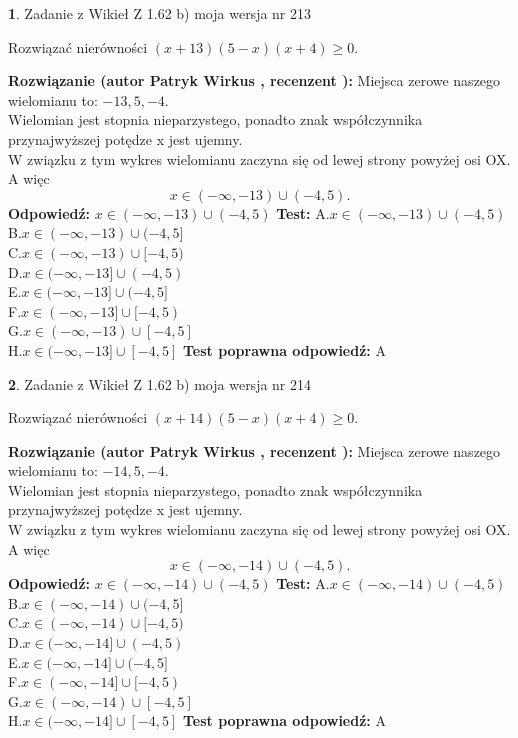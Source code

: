 \documentclass[12pt, a4paper]{article}
\theoremstyle{definition} %
\newtheorem{zad}{}
\newcommand{\zadStart}[1]{\begin{zad}#1\newline}
\newcommand{\zadStop}{\end{zad}}
\newcommand{\rozwStart}[2]{\noindent \textbf{Rozwiązanie (autor #1 , recenzent #2): }\newline}
\newcommand{\rozwStop}{\newline}
\newcommand{\odpStart}{\noindent \textbf{Odpowiedź:}\newline}
\newcommand{\odpStop}{\newline}
\newcommand{\testStart}{\noindent \textbf{Test:}\newline}
\newcommand{\testStop}{\newline}
\newcommand{\kluczStart}{\noindent \textbf{Test poprawna odpowiedź:}\newline}
\newcommand{\kluczStop}{\newline}
\begin{document}
\zadStart{Zadanie z Wikieł Z 1.62 b) moja wersja nr 213}

Rozwiązać nierówności $(x+13)(5-x)(x+4)\ge0$.
\zadStop
\rozwStart{Patryk Wirkus}{}
Miejsca zerowe naszego wielomianu to: $-13, 5, -4$.\\
Wielomian jest stopnia nieparzystego, ponadto znak współczynnika przy\linebreak najwyższej potędze x jest ujemny.\\ W związku z tym wykres wielomianu zaczyna się od lewej strony powyżej osi OX. A więc $$x \in (-\infty,-13) \cup (-4,5).$$
\rozwStop
\odpStart
$x \in (-\infty,-13) \cup (-4,5)$
\odpStop
\testStart
A.$x \in (-\infty,-13) \cup (-4,5)$\\
B.$x \in (-\infty,-13) \cup (-4,5]$\\
C.$x \in (-\infty,-13) \cup [-4,5)$\\
D.$x \in (-\infty,-13] \cup (-4,5)$\\
E.$x \in (-\infty,-13] \cup (-4,5]$\\
F.$x \in (-\infty,-13] \cup [-4,5)$\\
G.$x \in (-\infty,-13) \cup [-4,5]$\\
H.$x \in (-\infty,-13] \cup [-4,5]$
\testStop
\kluczStart
A
\kluczStop



\zadStart{Zadanie z Wikieł Z 1.62 b) moja wersja nr 214}

Rozwiązać nierówności $(x+14)(5-x)(x+4)\ge0$.
\zadStop
\rozwStart{Patryk Wirkus}{}
Miejsca zerowe naszego wielomianu to: $-14, 5, -4$.\\
Wielomian jest stopnia nieparzystego, ponadto znak współczynnika przy\linebreak najwyższej potędze x jest ujemny.\\ W związku z tym wykres wielomianu zaczyna się od lewej strony powyżej osi OX. A więc $$x \in (-\infty,-14) \cup (-4,5).$$
\rozwStop
\odpStart
$x \in (-\infty,-14) \cup (-4,5)$
\odpStop
\testStart
A.$x \in (-\infty,-14) \cup (-4,5)$\\
B.$x \in (-\infty,-14) \cup (-4,5]$\\
C.$x \in (-\infty,-14) \cup [-4,5)$\\
D.$x \in (-\infty,-14] \cup (-4,5)$\\
E.$x \in (-\infty,-14] \cup (-4,5]$\\
F.$x \in (-\infty,-14] \cup [-4,5)$\\
G.$x \in (-\infty,-14) \cup [-4,5]$\\
H.$x \in (-\infty,-14] \cup [-4,5]$
\testStop
\kluczStart
A
\kluczStop
\end{document}
